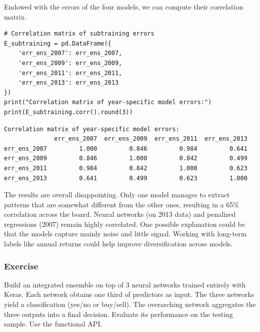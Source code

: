 Endowed with the errors of the four models, we can compute their correlation matrix.

\begin{verbatim}
# Correlation matrix of subtraining errors
E_subtraining = pd.DataFrame({
    'err_ens_2007': err_ens_2007,
    'err_ens_2009': err_ens_2009,
    'err_ens_2011': err_ens_2011,
    'err_ens_2013': err_ens_2013
})
print("Correlation matrix of year-specific model errors:")
print(E_subtraining.corr().round(3))
\end{verbatim}

\begin{verbatim}
Correlation matrix of year-specific model errors:
              err_ens_2007  err_ens_2009  err_ens_2011  err_ens_2013
err_ens_2007         1.000         0.846         0.984         0.641
err_ens_2009         0.846         1.000         0.842         0.499
err_ens_2011         0.984         0.842         1.000         0.623
err_ens_2013         0.641         0.499         0.623         1.000
\end{verbatim}

The results are overall disappointing. Only one model manages to extract patterns that are somewhat different from the other ones, resulting in a 65\% correlation across the board. Neural networks (on 2013 data) and penalized regressions (2007) remain highly correlated. One possible explanation could be that the models capture mainly noise and little signal. Working with long-term labels like annual returns could help improve diversification across models.

\subsubsection{Exercise}

Build an integrated ensemble on top of 3 neural networks trained entirely with Keras. Each network obtains one third of predictors as input. The three networks yield a classification (yes/no or buy/sell). The overarching network aggregates the three outputs into a final decision. Evaluate its performance on the testing sample. Use the functional API.